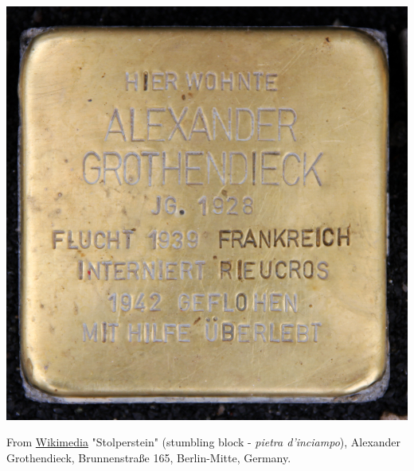 \documentclass[../main.tex]{subfiles}
\begin{document}
\begin{marginfigure}[-80mm]
    \includegraphics[width=1\linewidth]{images/Stolperstein_Brunnenstr_165_(Mitte)_Alexander_Grothendieck.jpg}
    \caption[stumbling block of Alexander Grothendieck]{From \href{https://commons.wikimedia.org/wiki/File:Stolperstein_Brunnenstr_165_(Mitte)_Alexander_Grothendieck.jpg}{Wikimedia} "Stolperstein" (stumbling block - \textit{pietra d'inciampo}), Alexander Grothendieck, Brunnenstraße 165, Berlin-Mitte, Germany.}
\end{marginfigure}
\end{document}
